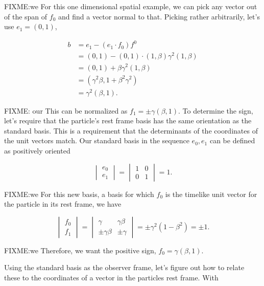 FIXME:we
For this one dimensional spatial example, we can pick any vector out of the span of $f_0$ and find a vector normal to that.  Picking rather arbitrarily, let's use $e_1 = (0, 1)$,

\begin{align*}
b
&= e_1 - (e_1 \cdot f_0) f^0 \\
&= (0, 1) - (0, 1) \cdot (1, \beta) \gamma^2 (1, \beta) \\
&= (0, 1) + \beta \gamma^2 (1, \beta) \\
&= (\gamma^2 \beta, 1 + \beta^2 \gamma^2) \\
&= \gamma^2 (\beta, 1 ).
\end{align*}

FIXME: our
This can be normalized as $f_1 = \pm \gamma(\beta, 1)$.  To determine the sign, let's require that the particle's rest frame basis has the same orientation as the standard basis.  This is a requirement that the determinants of the coordinates of the unit vectors match.  Our standard basis in the sequence $e_0, e_1$ can be defined as positively oriented

\begin{equation}\label{eqn:grahamSchmidtLorentz:680}
\begin{vmatrix}
e_0 \\
e_1
\end{vmatrix}
=
\begin{vmatrix}
1 & 0 \\
0 & 1
\end{vmatrix}
= 1.
\end{equation}

FIXME:we
For this new basis, a basis for which $f_0$ is the timelike unit vector for the particle in its rest frame, we have

\begin{equation}\label{eqn:grahamSchmidtLorentz:685}
\begin{vmatrix}
f_0 \\
f_1
\end{vmatrix}
=
\begin{vmatrix}
\gamma & \gamma \beta \\
\pm \gamma \beta & \pm \gamma
\end{vmatrix}
=
\pm \gamma^2 ( 1 - \beta^2)
= \pm 1.
\end{equation}

FIXME:we
Therefore, we want the positive sign, $f_0 = \gamma (\beta, 1)$.

Using the standard basis as the observer frame, let's figure out how to relate these to the coordinates of a vector in the particles rest frame.  With

